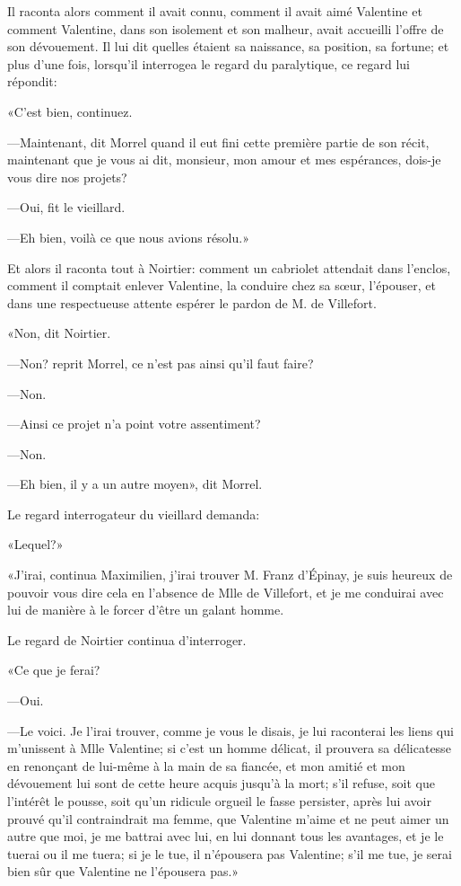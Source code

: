 Il raconta alors comment il avait connu, comment il avait aimé Valentine et comment Valentine, dans son isolement et son malheur, avait accueilli l'offre de son dévouement. Il lui dit quelles étaient sa naissance, sa position, sa fortune; et plus d'une fois, lorsqu'il interrogea le regard du paralytique, ce regard lui répondit: 

«C'est bien, continuez. 

—Maintenant, dit Morrel quand il eut fini cette première partie de son récit, maintenant que je vous ai dit, monsieur, mon amour et mes espérances, dois-je vous dire nos projets? 

—Oui, fit le vieillard. 

—Eh bien, voilà ce que nous avions résolu.» 

Et alors il raconta tout à Noirtier: comment un cabriolet attendait dans l'enclos, comment il comptait enlever Valentine, la conduire chez sa sœur, l'épouser, et dans une respectueuse attente espérer le pardon de M. de Villefort. 

«Non, dit Noirtier. 

—Non? reprit Morrel, ce n'est pas ainsi qu'il faut faire? 

—Non. 

—Ainsi ce projet n'a point votre assentiment? 

—Non. 

—Eh bien, il y a un autre moyen», dit Morrel. 

Le regard interrogateur du vieillard demanda:  

«Lequel?» 

«J'irai, continua Maximilien, j'irai trouver M. Franz d'Épinay, je suis heureux de pouvoir vous dire cela en l'absence de Mlle de Villefort, et je me conduirai avec lui de manière à le forcer d'être un galant homme. 

Le regard de Noirtier continua d'interroger. 

«Ce que je ferai? 

—Oui. 

—Le voici. Je l'irai trouver, comme je vous le disais, je lui raconterai les liens qui m'unissent à Mlle Valentine; si c'est un homme délicat, il prouvera sa délicatesse en renonçant de lui-même à la main de sa fiancée, et mon amitié et mon dévouement lui sont de cette heure acquis jusqu'à la mort; s'il refuse, soit que l'intérêt le pousse, soit qu'un ridicule orgueil le fasse persister, après lui avoir prouvé qu'il contraindrait ma femme, que Valentine m'aime et ne peut aimer un autre que moi, je me battrai avec lui, en lui donnant tous les avantages, et je le tuerai ou il me tuera; si je le tue, il n'épousera pas Valentine; s'il me tue, je serai bien sûr que Valentine ne l'épousera pas.» 

